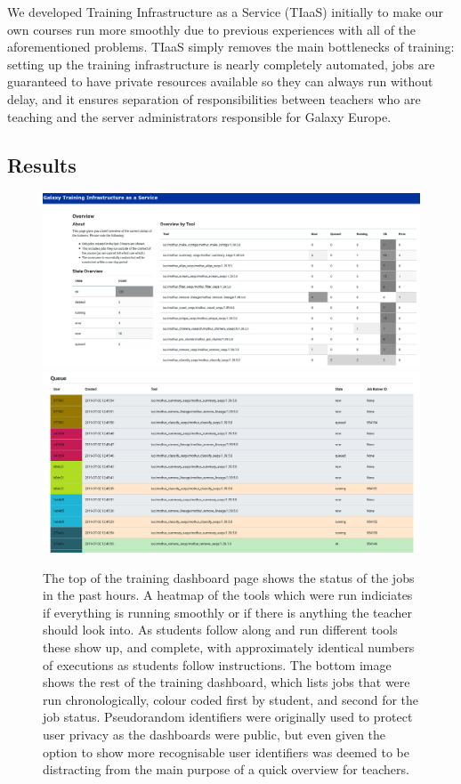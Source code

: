 \documentclass[a4paper,num-refs]{oup-contemporary}
\begin{document}
We developed Training Infrastructure as a Service (TIaaS) initially to make our own courses run more smoothly due to previous experiences with all of the aforementioned problems. TIaaS simply removes the main bottlenecks of training: setting up the training infrastructure is nearly completely automated, jobs are guaranteed to have private resources available so they can always run without delay, and it ensures separation of responsibilities between teachers who are teaching and the server administrators responsible for Galaxy Europe.

\subsection{Results}
\begin{figure}[bt!]
\centering
\includegraphics[width=\linewidth]{images/dashboard.png}
\includegraphics[width=\linewidth]{images/queue.png}
\caption{The top of the training dashboard page shows the status of the jobs in the past hours. A heatmap of the tools which were run indiciates if everything is running smoothly or if there is anything the teacher should look into. As students follow along and run different tools these show up, and complete, with approximately identical numbers of executions as students follow instructions. The bottom image shows the rest of the training dashboard, which lists jobs that were run chronologically, colour coded first by student, and second for the job status. Pseudorandom identifiers were originally used to protect user privacy as the dashboards were public, but even given the option to show more recognisable user identifiers was deemed to be distracting from the main purpose of a quick overview for teachers.}\label{figure:dashboard}
\end{figure}
\end{document}
